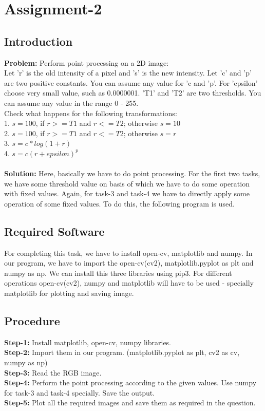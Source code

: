 \documentclass{article}
\begin{document}
{
    \section{Assignment-2}
    \subsection{Introduction}
    \textbf {Problem: }
    Perform point processing on a 2D image:\\
    Let 'r' is the old intensity of a pixel and 's' is the new intensity. Let
    'c' and 'p' are two positive constants. You can assume any value for 'c
    and 'p'. For 'epsilon' choose very small value, such as 0.0000001. 'T1'
    and 'T2' are two thresholds. You can assume any value in the range 0 -
    255.\\
    Check what happens for the following transformations:\\
    1. $s = 100$, if $r >= T1$ and $r <= T2$; otherwise $s = 10$\\
    2. $s = 100$, if $r >= T1$ and $r <= T2$; otherwise $s = r$\\
    3. $s = c*log(1 + r)$\\
    4. $s = c ( r + epsilon ) ^ p$\\
    \\
    \textbf{Solution: }
    Here, basically we have to do point processing. For the first two tasks, we have some threshold value on basis of which we have to do some operation with fixed values. Again, for task-3 and task-4 we have to directly apply some operation of some fixed values. To do this, the following program is used.
    \\
    
    \subsection{Required Software}
    For completing this task, we have to install open-cv, matplotlib and numpy. In our program, we have to import the open-cv(cv2), matplotlib.pyplot as plt and numpy as np. We can install this three libraries using pip3. For different operations open-cv(cv2), numpy and matplotlib will have to be used - specially matplotlib for plotting and saving image. 
    \\
    
    \subsection{Procedure}
    \textbf{Step-1:}
    Install matplotlib, open-cv, numpy libraries.\\
    \textbf{Step-2:}
    Import them in our program. (matplotlib.pyplot as plt, cv2 as cv, numpy as np)\\
    \textbf{Step-3:}
    Read the RGB image.\\
    \textbf{Step-4:}
    Perform the point processing according to the given values. Use numpy for task-3 and task-4 specially. Save the output.\\
    \textbf{Step-5:}
    Plot all the required images and save them as required in the question.\\
    
}
\end{document}
